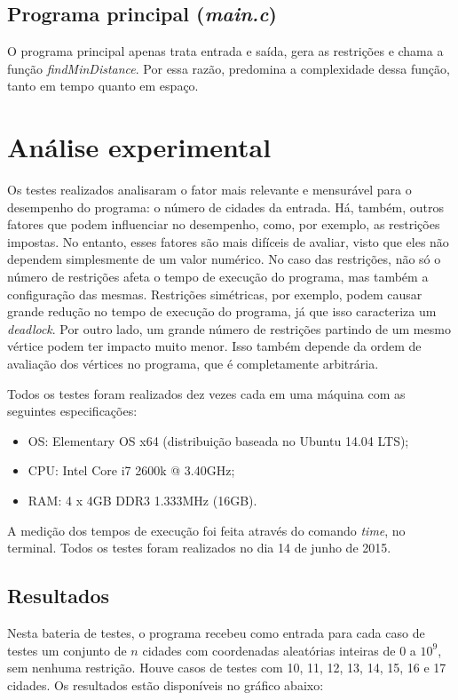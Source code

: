 \documentclass[10pt,a4paper]{article}
\numberwithin{equation}{section}
\begin{document}
\subsection{Programa principal (\emph{main.c})}

O programa principal apenas trata entrada e saída, gera as restrições e chama a função \emph{findMinDistance}. Por essa razão, predomina a complexidade dessa função, tanto em tempo quanto em espaço.

\section{Análise experimental}

Os testes realizados analisaram o fator mais relevante e mensurável para o desempenho do programa: o número de cidades da entrada. Há, também, outros fatores que podem influenciar no desempenho, como, por exemplo, as restrições impostas. No entanto, esses fatores são mais difíceis de avaliar, visto que eles não dependem simplesmente de um valor numérico. No caso das restrições, não só o número de restrições afeta o tempo de execução do programa, mas também a configuração das mesmas. Restrições simétricas, por exemplo, podem causar grande redução no tempo de execução do programa, já que isso caracteriza um \emph{deadlock}. Por outro lado, um grande número de restrições partindo de um mesmo vértice podem ter impacto muito menor. Isso também depende da ordem de avaliação dos vértices no programa, que é completamente arbitrária.

Todos os testes foram realizados dez vezes cada em uma máquina com as seguintes especificações:

\begin{itemize}
    \item OS: Elementary OS x64 (distribuição baseada no Ubuntu 14.04 LTS);
    \item CPU: Intel Core i7 2600k @ 3.40GHz;
    \item RAM: 4 x 4GB DDR3 1.333MHz (16GB).
\end{itemize}

A medição dos tempos de execução foi feita através do comando \emph{time}, no terminal. Todos os testes foram realizados no dia 14 de junho de 2015.

\subsection{Resultados}

Nesta bateria de testes, o programa recebeu como entrada para cada caso de testes um conjunto de $n$ cidades com coordenadas aleatórias inteiras de 0 a $10^9$, sem nenhuma restrição. Houve casos de testes com 10, 11, 12, 13, 14, 15, 16 e 17 cidades. Os resultados estão disponíveis no gráfico abaixo:
\end{document}
